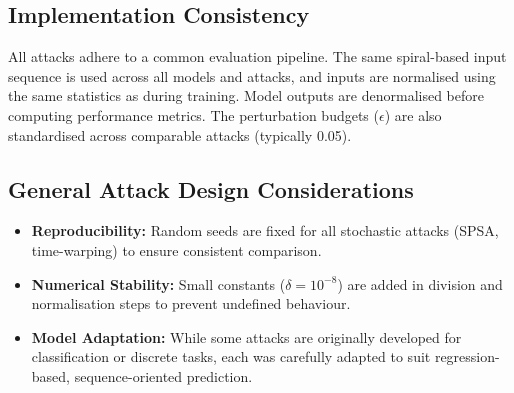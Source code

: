 \subsection*{Implementation Consistency}
All attacks adhere to a common evaluation pipeline.
The same spiral-based input sequence is used across all models and attacks, and inputs are normalised using the same statistics as during training. Model outputs are denormalised before computing performance metrics. The perturbation budgets ($\epsilon$) are also standardised across comparable attacks (typically 0.05).

\subsection*{General Attack Design Considerations}
\begin{itemize}
    \item \textbf{Reproducibility:} Random seeds are fixed for all stochastic attacks (SPSA, time-warping) to ensure consistent comparison.
    \item \textbf{Numerical Stability:} Small constants ($\delta = 10^{-8}$) are added in division and normalisation steps to prevent undefined behaviour.
    \item \textbf{Model Adaptation:} While some attacks are originally developed for classification or discrete tasks, each was carefully adapted to suit regression-based, sequence-oriented prediction.
\end{itemize}